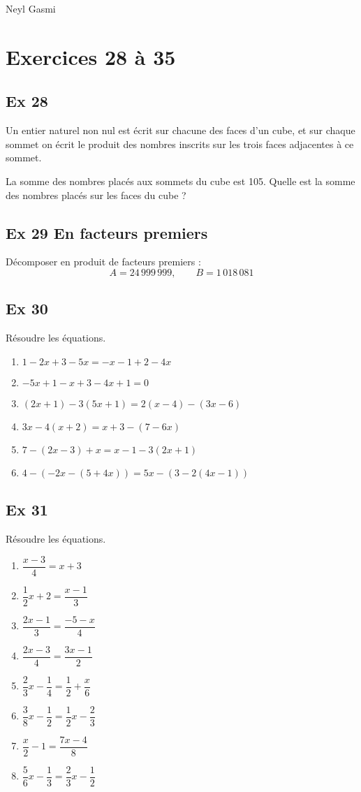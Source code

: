 \documentclass[a4paper,11pt]{article}
\begin{document}
Neyl Gasmi
\section*{Exercices 28 à 35}

\subsection*{Ex 28}
Un entier naturel non nul est écrit sur chacune des faces d’un cube, et sur chaque sommet on écrit le produit des nombres inscrits sur les trois faces adjacentes à ce sommet.  

La somme des nombres placés aux sommets du cube est 105.  
Quelle est la somme des nombres placés sur les faces du cube ?

\bigskip

\subsection*{Ex 29 \; En facteurs premiers}
Décomposer en produit de facteurs premiers :  
\[
A = 24\,999\,999, 
\qquad 
B = 1\,018\,081
\]

\bigskip

\subsection*{Ex 30}
Résoudre les équations.
\begin{enumerate}
  \item \(1 - 2x + 3 - 5x = -x - 1 + 2 - 4x\)
  \item \(-5x + 1 - x + 3 - 4x + 1 = 0\)
  \item \((2x+1) - 3(5x+1) = 2(x-4) - (3x-6)\)
  \item \(3x - 4(x+2) = x + 3 - (7 - 6x)\)
  \item \(7 - (2x-3) + x = x - 1 - 3(2x+1)\)
  \item \(4 - (-2x - (5+4x)) = 5x - (3 - 2(4x-1))\)
\end{enumerate}

\bigskip

\subsection*{Ex 31}
Résoudre les équations.
\begin{enumerate}
  \item \(\dfrac{x-3}{4} = x+3\)
  \item \(\dfrac{1}{2}x+2 = \dfrac{x-1}{3}\)
  \item \(\dfrac{2x-1}{3} = \dfrac{-5-x}{4}\)
  \item \(\dfrac{2x-3}{4} = \dfrac{3x-1}{2}\)
  \item \(\dfrac{2}{3}x - \dfrac{1}{4} = \dfrac{1}{2} + \dfrac{x}{6}\)
  \item \(\dfrac{3}{8}x - \dfrac{1}{2} = \dfrac{1}{2}x - \dfrac{2}{3}\)
  \item \(\dfrac{x}{2} - 1 = \dfrac{7x-4}{8}\)
  \item \(\dfrac{5}{6}x - \dfrac{1}{3} = \dfrac{2}{3}x - \dfrac{1}{2}\)
\end{enumerate}
\end{document}
